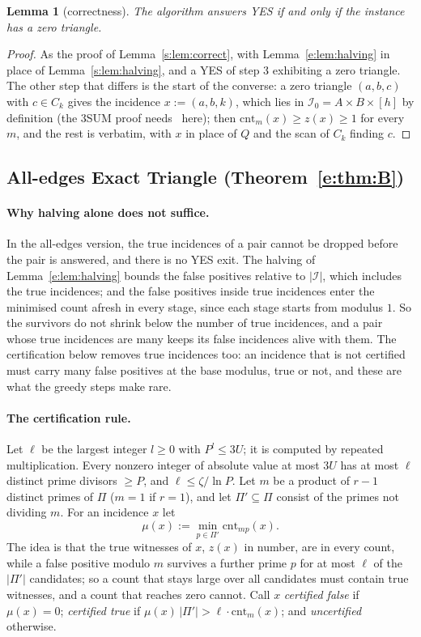 \documentclass[11pt]{article}
\newtheorem{lemma}[theorem]{Lemma}
\theoremstyle{definition}
\theoremstyle{remark}
\newcommand{\cnt}{\mathrm{cnt}}
\newcommand{\Iq}{\mathcal{I}}
\begin{document}
\begin{lemma}[correctness]\label{e:lem:correctA}
The algorithm answers YES if and only if the instance has a zero triangle.
\end{lemma}
\begin{proof}
As the proof of Lemma~\ref{s:lem:correct}, with Lemma~\ref{e:lem:halving} in place of Lemma~\ref{s:lem:halving}, and a YES of step 3 exhibiting a zero triangle. The other step that differs is the start of the converse: a zero triangle $(a,b,c)$ with $c\in C_k$ gives the incidence $x:=(a,b,k)$, which lies in $\Iq_0=A\times B\times[h]$ by definition (the 3SUM proof needs~\cite[Lemma~3.3]{FKP24} here); then $\cnt_m(x)\ge z(x)\ge1$ for every $m$, and the rest is verbatim, with $x$ in place of $Q$ and the scan of $C_k$ finding $c$.
\end{proof}

\subsection{All-edges Exact Triangle (Theorem~\ref{e:thm:B})}\label{e:sec:alledges}

\paragraph{Why halving alone does not suffice.} In the all-edges version, the true incidences of a pair cannot be dropped before the pair is answered, and there is no YES exit. The halving of Lemma~\ref{e:lem:halving} bounds the false positives relative to $|\Iq|$, which includes the true incidences; and the false positives inside true incidences enter the minimised count afresh in every stage, since each stage starts from modulus $1$. So the survivors do not shrink below the number of true incidences, and a pair whose true incidences are many keeps its false incidences alive with them. The certification below removes true incidences too: an incidence that is not certified must carry many false positives at the base modulus, true or not, and these are what the greedy steps make rare.

\paragraph{The certification rule.} Let $\ell$ be the largest integer $l\ge0$ with $P^l\le3U$; it is computed by repeated multiplication. Every nonzero integer of absolute value at most $3U$ has at most $\ell$ distinct prime divisors $\ge P$, and $\ell\le\zeta/\ln P$. Let $m$ be a product of $r-1$ distinct primes of $\Pi$ ($m=1$ if $r=1$), and let $\Pi'\subseteq\Pi$ consist of the primes not dividing $m$. For an incidence $x$ let
\[
\mu(x):=\min_{p\in\Pi'}\cnt_{mp}(x).
\]
The idea is that the true witnesses of $x$, $z(x)$ in number, are in every count, while a false positive modulo $m$ survives a further prime $p$ for at most $\ell$ of the $|\Pi'|$ candidates; so a count that stays large over all candidates must contain true witnesses, and a count that reaches zero cannot. Call $x$ \emph{certified false} if $\mu(x)=0$; \emph{certified true} if $\mu(x)\,|\Pi'|>\ell\cdot\cnt_m(x)$; and \emph{uncertified} otherwise.
\end{document}
